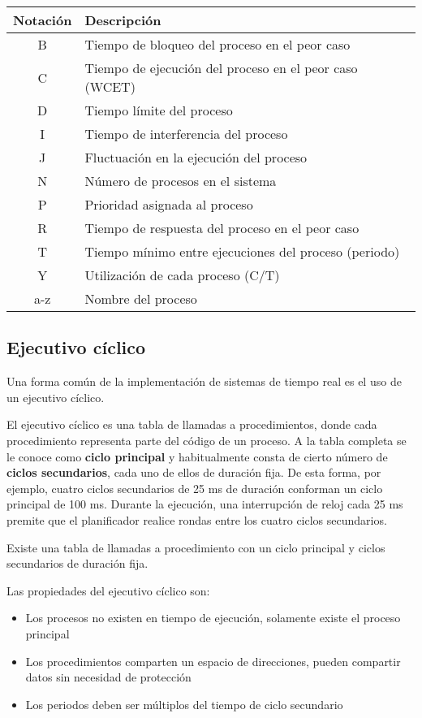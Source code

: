 \begin{tabular}{|c|l|}
	\hline 
	Notación & Descripción \\ 
	\hline 
	B &  Tiempo de bloqueo del proceso en el peor caso \\ 
	\hline 
	C &  Tiempo de ejecución del proceso en el peor caso (WCET) \\ 
	\hline
	D &  Tiempo límite del proceso \\
	\hline
	I &  Tiempo de interferencia del proceso \\
	\hline
	J &  Fluctuación en la ejecución del proceso \\
	\hline
	N &  Número de procesos en el sistema \\
	\hline
	P &  Prioridad asignada al proceso \\
	\hline
	R &  Tiempo de respuesta del proceso en el peor caso \\
	\hline
	T &  Tiempo mínimo entre ejecuciones del proceso (periodo) \\
	\hline
	Y &  Utilización de cada proceso (C/T) \\
	\hline
	a-z &  Nombre del proceso \\
	\hline
\end{tabular} 


\subsection{Ejecutivo cíclico}

Una forma común de la implementación de sistemas de tiempo real es el uso de un
ejecutivo cíclico.


El ejecutivo cíclico es una tabla de llamadas a procedimientos, donde cada
procedimiento representa parte del código de un proceso. A la tabla completa se
le conoce como \textbf{ciclo principal} y habitualmente consta de cierto número
de \textbf{ciclos secundarios}, cada uno de ellos de duración fija. De esta
forma, por ejemplo, cuatro ciclos secundarios de 25 ms de duración conforman un
ciclo principal de 100 ms. Durante la ejecución, una interrupción de reloj cada
25 ms premite que el planificador realice rondas entre los cuatro ciclos
secundarios.

Existe una tabla de llamadas a procedimiento con un ciclo principal y ciclos
secundarios de duración fija.

Las propiedades del ejecutivo cíclico son:

\begin{itemize}
	\item Los procesos no existen en tiempo de ejecución, solamente existe
		el proceso principal
	\item Los procedimientos comparten un espacio de direcciones, pueden
		compartir datos sin necesidad de protección
	\item Los periodos deben ser múltiplos del tiempo de ciclo secundario
\end{itemize}

